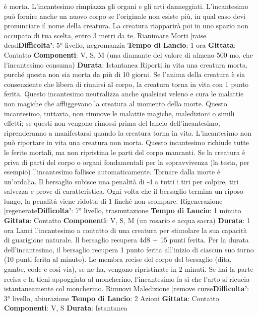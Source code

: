 \begin{multicols}{2}
è morta. L’incantesimo rimpiazza gli organi e gli arti
danneggiati.
L’incantesimo può fornire anche un nuovo corpo se
l’originale non esiste più, in qual caso devi pronunciare
il nome della creatura. La creatura riapparirà poi in uno
spazio non occupato di tua scelta, entro 3 metri da te.
Rianimare Morti
[raise dead\textbf{Difficolta'}:
5° livello, negromanzia
\textbf{Tempo di Lancio}: 1 ora
\textbf{Gittata}: Contatto
\textbf{Componenti}: V, S, M (una diamante del valore di
almeno 500 mo, che l’incantesimo consuma)
\textbf{Durata}: Istantanea
Riporti in vita una creatura morta, purché questa non
sia morta da più di 10 giorni. Se l’anima della creatura è
sia consenziente che libera di riunirsi al corpo, la
creatura torna in vita con 1 punto ferita.
Questo incantesimo neutralizza anche qualsiasi veleno
e cura le malattie non magiche che affliggevano la
creatura al momento della morte. Questo incantesimo,
tuttavia, non rimuove le malattie magiche, maledizioni o
simili effetti; se questi non vengono rimossi prima del
lancio dell’incantesimo, riprenderanno a manifestarsi
quando la creatura torna in vita. L’incantesimo non può
riportare in vita una creatura non morta.
Questo incantesimo richiude tutte le ferite mortali, ma
non ripristina le parti del corpo mancanti. Se la creatura
è priva di parti del corpo o organi fondamentali per la
sopravvivenza (la testa, per esempio) l’incantesimo
fallisce automaticamente.
Tornare dalla morte è un’ordalia. Il bersaglio subisce
una penalità di -4 a tutti i tiri per colpire, tiri salvezza e
prove di caratteristica. Ogni volta che il bersaglio
termina un riposo lungo, la penalità viene ridotta di 1
finché non scompare.
Rigenerazione
[regenerate\textbf{Difficolta'}:
7° livello, trasmutazione
\textbf{Tempo di Lancio}: 1 minuto
\textbf{Gittata}: Contatto
\textbf{Componenti}: V, S, M (un rosario e acqua sacra)
\textbf{Durata}: 1 ora
Lanci l’incantesimo a contatto di una creatura per
stimolare la sua capacità di guarigione naturale. Il
bersaglio recupera 4d8 + 15 punti ferita. Per la durata
dell’incantesimo, il bersaglio recupera 1 punto ferita
all’inizio di ciascun suo turno (10 punti ferita al minuto).
Le membra recise del corpo del bersaglio (dita, gambe,
code e così via), se ne ha, vengono ripristinate in 2
minuti. Se hai la parte recisa e la tieni appoggiata al
moncherino, l’incantesimo fa sì che l’arto si ricucia
istantaneamente col moncherino.
Rimuovi Maledizione
[remove curse\textbf{Difficolta'}:
3° livello, abiurazione
\textbf{Tempo di Lancio}: 2 Azioni
\textbf{Gittata}: Contatto
\textbf{Componenti}: V, S
\textbf{Durata}: Istantanea

\end{multicols}
